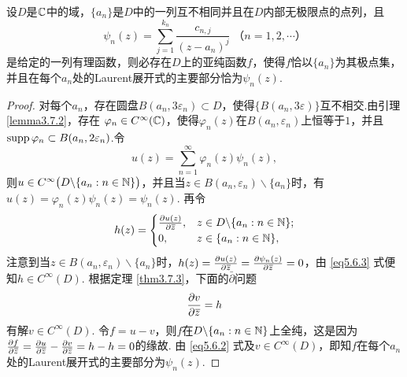 \begin{theorem}\label{thm5.6.2}
  设$D$是$\mathbb C$中的域，$\{a_n\}$是$D$中的一列互不相同并且在$D$内部无极限点的点列，且
  \begin{equation}\label{eq5.6.1}
    \psi_n(z) = \sum_{j=1}^{k_n}\frac{c_{n,j}}{(z-a_n)^j}\;\mbox{（$n=1,2,\cdots$）}
  \end{equation}
  是给定的一列有理函数，则必存在$D$上的亚纯函数$f$，使得$f$恰以$\{a_n\}$为其极点集，并且在每个$a_n$处的Laurent展开式的主要部分恰为$\psi_n(z)$.
\end{theorem}
\begin{proof}
  对每个$a_n$，存在圆盘$B(a_n,3\varepsilon_n)\subset D$，使得$\{B(a_n,3\varepsilon)\}$互不相交.由引理 \ref{lemma3.7.2}，存在 $\varphi_n\in C^\infty(\mathbb C)$，使得$\varphi_n(z)$在$B(a_n,\varepsilon_n)$上恒等于$1$，并且$\operatorname{supp}\varphi_n \subset B(a_n,2\varepsilon_n)$.令
  \begin{equation}\label{eq5.6.2}
    u(z) = \sum_{n=1}^\infty\varphi_n(z)\psi_n(z),
  \end{equation}
  则$u\in C^\infty\big(D\backslash\{a_n:n\in\mathbb N\}\big)$，并且当$z\in B(a_n,\varepsilon_n)\backslash\{a_n\}$时，有$u(z)=\varphi_n(z)\psi_n(z)=\psi_n(z)$. 再令
  \begin{equation}\label{eq5.6.3}
    h(z) = \begin{cases}
      \frac{\partial u(z)}{\partial {}\mkern1mu\overline{\mkern-1muz}}, & z\in D\backslash\{a_n:n\in\mathbb N\};\\
      0, & z\in\{a_n:n\in\mathbb N\},
    \end{cases}
  \end{equation}
  注意到当$z\in B(a_n,\varepsilon_n)\backslash\{a_n\}$时，$h(z)=\frac{\partial u(z)}{\partial {}\mkern1mu\overline{\mkern-1muz}}
  =\frac{\partial \psi_n(z)}{\partial {}\mkern1mu\overline{\mkern-1muz}}=0$，由 \eqref{eq5.6.3} 式便知$h\in C^\infty(D)$. 根据定理 \ref{thm3.7.3}，下面的$\bar\partial$问题
  \[
    \frac{\partial v}{\partial {}\mkern1mu\overline{\mkern-1muz}} = h
  \]
  有解$v\in C^\infty(D)$. 令$f=u-v$，则$f$在$D\backslash\{a_n:n\in\mathbb N\}$上全纯，这是因为
  $\frac{\partial f}{\partial {}\mkern1mu\overline{\mkern-1muz}}=\frac{\partial u}{\partial {}\mkern1mu\overline{\mkern-1muz}}-\frac{\partial v}{\partial {}\mkern1mu\overline{\mkern-1muz}}=h-h=0$的缘故. 由 \eqref{eq5.6.2} 式及$v\in C^\infty(D)$，即知$f$在每个$a_n$处的Laurent展开式的主要部分为$\psi_n(z)$.
\end{proof}

